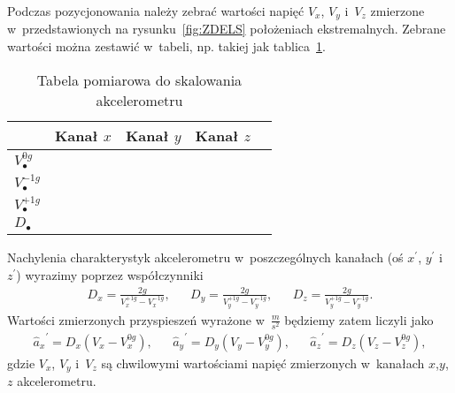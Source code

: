 \documentclass[paper=a4,DIV=12]{tmmlab}
\begin{document}
Podczas pozycjonowania należy zebrać wartości napięć $V_x$, $V_y$ i~$V_z$
zmierzone w~przedstawionych na rysunku~\ref{fig:ZDELS} położeniach
ekstremalnych. Zebrane wartości można zestawić w~tabeli, np. takiej jak
tablica~\ref{tab:Q31HW}.
\begin{table}[htbp]
  \centering
  \caption{Tabela pomiarowa do skalowania akcelerometru}
  \label{tab:Q31HW}
  \begin{tabular}{|l|c|c|c|c|}
    \hline
                        & Kanał $x$ & Kanał $y$ & Kanał $z$ \\ \hline
    $V_{\bullet}^{0g}$  &           &           &           \\ \hline
    $V_{\bullet}^{-1g}$ &           &           &           \\ \hline
    $V_{\bullet}^{+1g}$ &           &           &           \\ \hline
    $D_{\bullet}$       &           &           &           \\ \hline
  \end{tabular}
\end{table}

Nachylenia charakterystyk akcelerometru w~poszczególnych kanałach (oś $x^{\prime}$,
$y^{\prime}$ i~$z^{\prime}$) wyrazimy poprzez współczynniki
\begin{align}
  & D_x = \frac{2 g}{V_x^{+1g} - V_x^{-1g}}, &
  & D_y = \frac{2 g}{V_y^{+1g} - V_y^{-1g}}, &
  & D_z = \frac{2 g}{V_y^{+1g} - V_y^{-1g}}. &
  \label{eq:TUSWM}
\end{align}
Wartości zmierzonych przyspieszeń wyrażone w~$\tfrac{m}{s^2}$ będziemy zatem
liczyli jako
\begin{align}
  &{\hat{a}_x}^{\prime}= D_x \left(V_x - V_x^{0g}\right),&
  &{\hat{a}_y}^{\prime}= D_y \left(V_y - V_y^{0g}\right),&
  &{\hat{a}_z}^{\prime}= D_z \left(V_z - V_z^{0g}\right),&
  \label{eq:HM7PF}
\end{align}
gdzie $V_x$, $V_y$ i~$V_z$ są chwilowymi wartościami napięć zmierzonych
w~kanałach $x$,$y$,$z$ akcelerometru.
\end{document}
